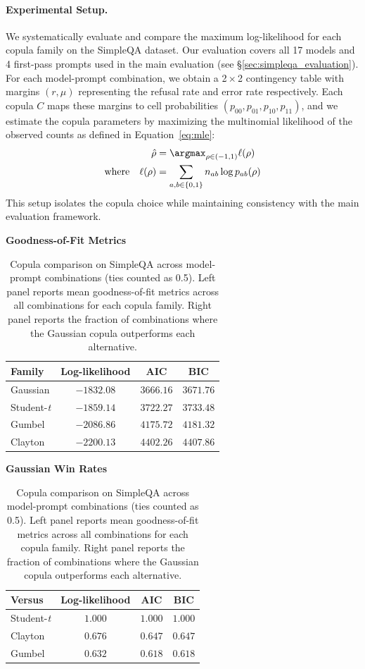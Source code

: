 \documentclass{article} %
\theoremstyle{definition}
\begin{document}
\paragraph{Experimental Setup.}
We systematically evaluate and compare the maximum log-likelihood for each copula family on the SimpleQA dataset. Our evaluation covers all 17 models and 4 first-pass prompts used in the main evaluation (see \S\ref{sec:simpleqa_evaluation}). 
For each model-prompt combination, we obtain a 2\,$\times$\,2 contingency table with margins $(r,\mu)$ representing the refusal rate and error rate respectively. Each copula $C$ maps these margins to cell probabilities $(p_{00},p_{01},p_{10},p_{11})$, and we estimate the copula parameters by maximizing the multinomial likelihood of the observed counts as defined in Equation~\ref{eq:mle}:
\begin{align}
\hat{\rho} &= \argmax_{\rho \in (-1,1)} \ell(\rho) \nonumber\\
\text{where} \quad \ell(\rho) &= \sum_{a,b\in\{0,1\}} n_{ab} \log p_{ab}(\rho) \label{eq:mle}
\end{align}
This setup isolates the copula choice while maintaining consistency with the main evaluation framework.

\begin{table}[t]
  \centering
  \small
  \caption{Copula comparison on SimpleQA across model-prompt combinations (ties counted as 0.5). Left panel reports mean goodness-of-fit metrics across all combinations for each copula family. Right panel reports the fraction of combinations where the Gaussian copula outperforms each alternative.}
  \label{tab:copula_comparison}
  \begin{minipage}[t]{0.48\textwidth}
    \centering
    \textbf{Goodness-of-Fit Metrics}
    \begin{tabular}{@{}lccc@{}}
      \toprule
      Family & Log-likelihood & AIC & BIC \\
      \midrule
      Gaussian & $-1832.08$ & $3666.16$ & $3671.76$ \\
      Student-\emph{t} & $-1859.14$ & $3722.27$ & $3733.48$ \\
      Gumbel & $-2086.86$ & $4175.72$ & $4181.32$ \\
      Clayton & $-2200.13$ & $4402.26$ & $4407.86$ \\
      \bottomrule
    \end{tabular}
  \end{minipage}
  \hfill
  \begin{minipage}[t]{0.48\textwidth}
    \centering
    \textbf{Gaussian Win Rates}
    \begin{tabular}{@{}lccc@{}}
      \toprule
      Versus & Log-likelihood & AIC & BIC \\
      \midrule
      Student-\emph{t} & $1.000$ & $1.000$ & $1.000$ \\
      Clayton & $0.676$ & $0.647$ & $0.647$ \\
      Gumbel & $0.632$ & $0.618$ & $0.618$ \\
      \bottomrule
    \end{tabular}
  \end{minipage}
\end{table}
\end{document}
